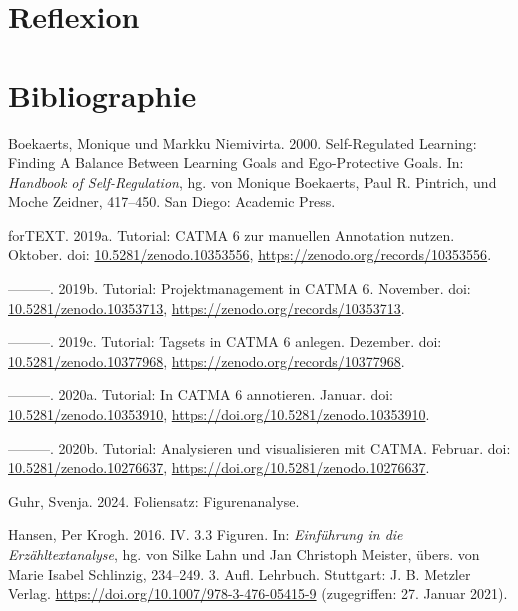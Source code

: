 \documentclass[
          a4paper,
        ]{article}
\newlength{\cslhangindent}
\newenvironment{CSLReferences}[2] %
 {\begin{list}{}{%
  \setlength{\itemindent}{0pt}
  \setlength{\leftmargin}{0pt}
  \setlength{\parsep}{0pt}
  \ifodd #1
   \setlength{\leftmargin}{\cslhangindent}
   \setlength{\itemindent}{-1\cslhangindent}
  \fi
  \setlength{\itemsep}{#2\baselineskip}}}
 {\end{list}}
\begin{document}
\section{Reflexion}\label{reflexion}

\section*{Bibliographie}\label{bibliography}

\label{refs}
\begin{CSLReferences}{1}{0}
Boekaerts, Monique und Markku Niemivirta. 2000. Self-Regulated Learning:
Finding A Balance Between Learning Goals and Ego-Protective Goals. In:
\emph{Handbook of Self-Regulation}, hg. von Monique Boekaerts, Paul R.
Pintrich, und Moche Zeidner, 417--450. San Diego: Academic Press.

forTEXT. 2019a. Tutorial: {CATMA} 6 zur manuellen {Annotation} nutzen.
Oktober. doi:
\href{https://doi.org/10.5281/zenodo.10353556}{10.5281/zenodo.10353556},
\url{https://zenodo.org/records/10353556}.

---------. 2019b. Tutorial: {Projektmanagement} in {CATMA} 6. November.
doi:
\href{https://doi.org/10.5281/zenodo.10353713}{10.5281/zenodo.10353713},
\url{https://zenodo.org/records/10353713}.

---------. 2019c. Tutorial: {Tagsets} in {CATMA} 6 anlegen. Dezember.
doi:
\href{https://doi.org/10.5281/zenodo.10377968}{10.5281/zenodo.10377968},
\url{https://zenodo.org/records/10377968}.

---------. 2020a. Tutorial: {In} {CATMA} 6 annotieren. Januar. doi:
\href{https://doi.org/10.5281/zenodo.10353910}{10.5281/zenodo.10353910},
\url{https://doi.org/10.5281/zenodo.10353910}.

---------. 2020b. Tutorial: {Analysieren} und visualisieren mit {CATMA}.
Februar. doi:
\href{https://doi.org/10.5281/zenodo.10276637}{10.5281/zenodo.10276637},
\url{https://doi.org/10.5281/zenodo.10276637}.

Guhr, Svenja. 2024. Foliensatz: Figurenanalyse.

Hansen, Per Krogh. 2016. {IV}. 3.3 {Figuren}. In: \emph{Einführung in
die {Erzähltextanalyse}}, hg. von Silke Lahn und Jan Christoph Meister,
übers. von Marie Isabel Schlinzig, 234--249. 3. Aufl. Lehrbuch.
Stuttgart: J. B. Metzler Verlag.
\url{https://doi.org/10.1007/978-3-476-05415-9} (zugegriffen: 27. Januar
2021).


\end{CSLReferences}
\end{document}

